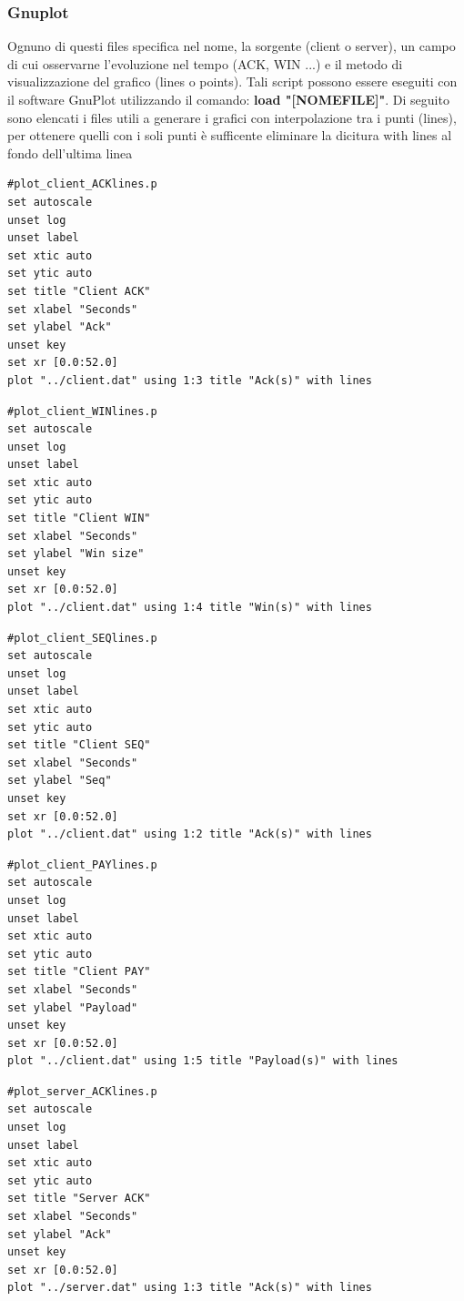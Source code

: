 \documentclass[12pt]{article}
\begin{document}
\subsubsection{Gnuplot}
Ognuno di questi files specifica nel nome, la sorgente (client o server), un campo di cui osservarne l'evoluzione nel tempo (ACK, WIN ...) e il metodo di visualizzazione del grafico (lines o points).
Tali script possono essere eseguiti con il software GnuPlot utilizzando il comando: \textbf{load "[NOMEFILE]"}.
Di seguito sono elencati i files utili a generare i grafici con interpolazione tra i punti (lines), per ottenere quelli con i soli punti è sufficente eliminare la dicitura with lines al fondo dell'ultima linea\\
\begin{lstlisting}
#plot_client_ACKlines.p
set autoscale
unset log
unset label
set xtic auto
set ytic auto
set title "Client ACK"
set xlabel "Seconds"
set ylabel "Ack"
unset key
set xr [0.0:52.0]
plot "../client.dat" using 1:3 title "Ack(s)" with lines
\end{lstlisting}

\newpage

\begin{lstlisting}
#plot_client_WINlines.p
set autoscale
unset log
unset label
set xtic auto
set ytic auto
set title "Client WIN"
set xlabel "Seconds"
set ylabel "Win size"
unset key
set xr [0.0:52.0]
plot "../client.dat" using 1:4 title "Win(s)" with lines
\end{lstlisting}

\begin{lstlisting}
#plot_client_SEQlines.p
set autoscale
unset log
unset label
set xtic auto
set ytic auto
set title "Client SEQ"
set xlabel "Seconds"
set ylabel "Seq"
unset key
set xr [0.0:52.0]
plot "../client.dat" using 1:2 title "Ack(s)" with lines
\end{lstlisting}



\begin{lstlisting}
#plot_client_PAYlines.p
set autoscale
unset log
unset label
set xtic auto
set ytic auto
set title "Client PAY"
set xlabel "Seconds"
set ylabel "Payload"
unset key
set xr [0.0:52.0]
plot "../client.dat" using 1:5 title "Payload(s)" with lines
\end{lstlisting}

\begin{lstlisting}
#plot_server_ACKlines.p
set autoscale
unset log
unset label
set xtic auto
set ytic auto
set title "Server ACK"
set xlabel "Seconds"
set ylabel "Ack"
unset key
set xr [0.0:52.0]
plot "../server.dat" using 1:3 title "Ack(s)" with lines
\end{lstlisting}
\end{document}
